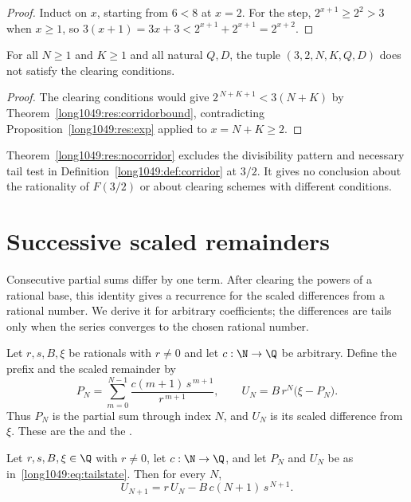 \begin{proof}
Induct on $x$, starting from $6<8$ at $x=2$.  For the step, $2^{x+1}\ge2^{2}>3$ when
$x\ge1$, so $3(x+1)=3x+3<2^{x+1}+2^{x+1}=2^{x+2}$.
\end{proof}

\begin{theorem}\label{long1049:res:nocorridor}
For all $N\ge1$ and $K\ge1$ and all natural $Q,D$, the tuple
$(3,2,N,K,Q,D)$ does not satisfy the clearing conditions.
\end{theorem}

\begin{proof}
The clearing conditions would give $2^{\,N+K+1}<3(N+K)$ by
Theorem~\ref{long1049:res:corridorbound}, contradicting Proposition~\ref{long1049:res:exp}
applied to $x=N+K\ge2$.
\end{proof}

Theorem~\ref{long1049:res:nocorridor} excludes the divisibility pattern and
necessary tail test in Definition~\ref{long1049:def:corridor} at $3/2$.
It gives no conclusion about the rationality of $F(3/2)$ or about
clearing schemes with different conditions.

\section{Successive scaled remainders}\label{long1049:sec:tail}

Consecutive partial sums differ by one term. After clearing the
powers of a rational base, this identity gives a recurrence for
the scaled differences from a rational number. We derive it for
arbitrary coefficients; the differences are tails only when the
series converges to the chosen rational number.

Let $r,s,B,\xi$ be rationals with $r\ne0$ and let $c:\N\to\Q$ be arbitrary.
Define the prefix and the scaled remainder by
\[
 P_N=\sum_{m=0}^{N-1}\frac{c(m+1)\,s^{\,m+1}}{r^{\,m+1}},
 \qquad
 U_N=B\,r^{N}\bigl(\xi-P_N\bigr).
\tag{$\ast$}\label{long1049:eq:tailstate}
\]
Thus $P_N$ is the partial sum through index $N$, and $U_N$ is its
scaled difference from $\xi$. These are the
 and the
.

\begin{theorem}\label{long1049:res:tailrec}
Let $r,s,B,\xi\in\Q$ with $r\ne0$, let $c:\N\to\Q$, and let $P_N$ and $U_N$ be as
in~\eqref{long1049:eq:tailstate}.  Then for every $N$,
\[
 U_{N+1}=r\,U_N-B\,c(N+1)\,s^{\,N+1}.
\]
\end{theorem}


